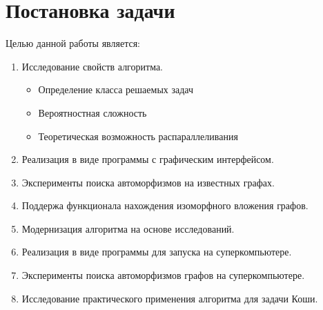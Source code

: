 \section{Постановка задачи}
\label{sec:Problem_1} 
\large

Целью данной работы является:
\begin{enumerate}
\item Исследование свойств алгоритма.
\begin{itemize}
\item Определение класса решаемых задач
\item Вероятностная сложность
\item Теоретическая возможность распараллеливания
\end{itemize}
\item Реализация в виде программы с графическим интерфейсом.
\item Эксперименты поиска автоморфизмов на известных графах.
\item Поддержа функционала нахождения изоморфного вложения графов.
\item Модернизация алгоритма на основе исследований.
\item Реализация в виде программы для запуска на суперкомпьютере.
\item Эксперименты поиска автоморфизмов графов на суперкомпьютере.
\item Исследование практического применения алгоритма для задачи Коши.
\end{enumerate}

